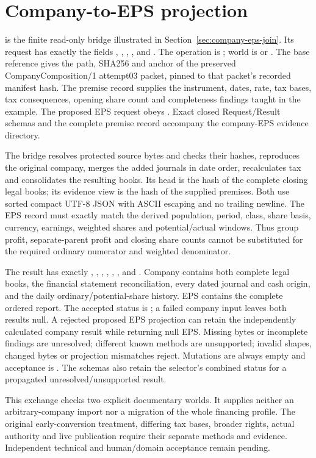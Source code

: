 \section{Company-to-EPS projection}
\label{sec:company-eps-records}

 is the finite read-only bridge illustrated in
Section~\ref{sec:company-eps-join}. Its request has exactly the fields
, , , ,
 and . The operation is ; world is
 or . The base reference gives the path,
SHA256 and anchor of the preserved CompanyComposition/1 attempt03 packet,
pinned to that packet's recorded manifest hash. The premise record supplies
the instrument, dates, rate, tax bases, tax consequences, opening share count
and completeness findings taught in the example. The proposed EPS request
obeys . Exact closed Request/Result schemas and the complete
premise record accompany the company-EPS evidence directory.

The bridge resolves protected source bytes and checks their hashes, reproduces
the original company, merges the added journals in date order, recalculates
tax and consolidates the resulting books. Its head is the hash of the complete
closing legal books; its evidence view is the hash of the supplied premises.
Both use sorted compact UTF-8 JSON with ASCII escaping and no trailing newline.
The EPS record must exactly match the derived population, period, class,
share basis, currency, earnings, weighted shares and potential/actual windows.
Thus group profit, separate-parent profit and closing share counts cannot be
substituted for the required ordinary numerator and weighted denominator.

The result has exactly , , ,
, , ,  and
. Company contains both complete legal books, the financial
statement reconciliation, every dated journal and cash origin, and the daily
ordinary/potential-share history. EPS contains the complete ordered report.
The accepted status is ; a failed company input
leaves both results null. A rejected proposed EPS projection can retain the
independently calculated company result while returning null EPS. Missing
bytes or incomplete findings are unresolved; different known methods are
unsupported; invalid shapes, changed bytes or projection mismatches reject.
Mutations are always empty and acceptance is
. The schemas also retain the selector's
combined  status for a propagated unresolved/unsupported result.

This exchange checks two explicit documentary worlds. It supplies neither
an arbitrary-company import nor a migration of the whole financing profile.
The original early-conversion treatment, differing tax bases, broader rights,
actual authority and live publication require their separate methods and
evidence. Independent technical and human/domain acceptance remain pending.
